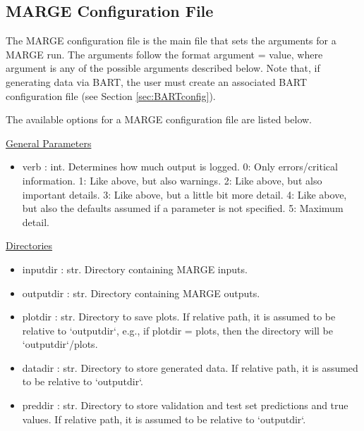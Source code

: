 \documentclass[letterpaper, 12pt]{article}
\begin{document}
\subsection{MARGE Configuration File}
\label{sec:config}
The MARGE configuration file is the main file that sets the arguments for a 
MARGE run. The arguments follow the format {\ttb argument = value}, where 
{\ttb argument} is any of the possible arguments described below. Note that, 
if generating data via BART, the user must create an associated BART 
configuration file (see Section \ref{sec:BARTconfig}).

\noindent The available options for a MARGE configuration file are listed below.

\noindent \underline{General Parameters}
\begin{itemize}
	\item verb   : int. Determines how much output is logged.  
	                          0: Only errors/critical information.  
	                          1: Like above, but also warnings.  
	                          2: Like above, but also important details.  
	                          3: Like above, but a little bit more detail.  
	                          4: Like above, but also the defaults assumed if a parameter is not specified.  
	                          5: Maximum detail.
\end{itemize}

\noindent \underline{Directories}
\begin{itemize}
\item inputdir   : str.  Directory containing MARGE inputs.
\item outputdir  : str.  Directory containing MARGE outputs.
\item plotdir    : str.  Directory to save plots. 
                         If relative path, it is assumed to be relative to `outputdir`,
                         e.g., if plotdir = plots, then the directory will be `outputdir`/plots.
\item datadir    : str.  Directory to store generated data. 
                         If relative path, it is assumed to be relative to `outputdir`.
\item preddir    : str.  Directory to store validation and test set predictions and true values. 
                         If relative path, it is assumed to be relative to `outputdir`.
\end{itemize}
\end{document}

